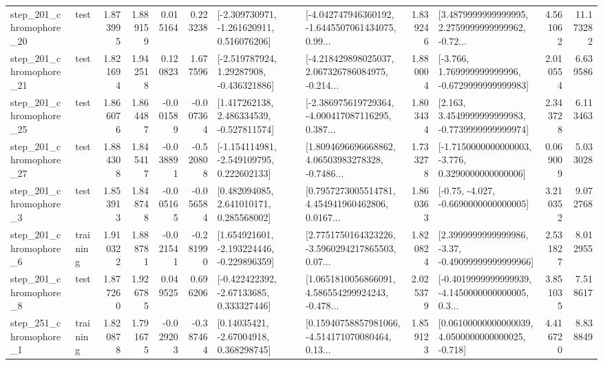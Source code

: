 \begin{tabular}{llrrrrllrlrr}
  step\_201\_chromophore\_20 &      test &      1.873995 &    1.889159 &      0.015164 &  0.223238 &   [-2.309730971, -1.261620911, 0.516076206] &  [-4.042747946360192, -1.6445507061434075, 0.99... &       1.839246 &  [3.4879999999999995, 2.2759999999999962, -0.72... &            4.561062 &         11.173282 \\
  step\_201\_chromophore\_21 &      test &      1.821694 &    1.942518 &      0.120823 &  1.677596 &    [-2.519787924, 1.29287908, -0.436321886] &  [-4.218429898025037, 2.067326786084975, -0.214... &       1.880004 &   [-3.766, 1.769999999999996, -0.6729999999999983] &            2.010554 &          6.639586 \\
  step\_201\_chromophore\_25 &      test &      1.866076 &    1.864487 &     -0.001589 & -0.007364 &    [1.417262138, 2.486334539, -0.527811574] &  [-2.386975619729364, -4.000417087116295, 0.387... &       1.803434 &   [2.163, 3.4549999999999983, -0.7739999999999974] &            2.343728 &          6.113463 \\
  step\_201\_chromophore\_27 &      test &      1.884308 &    1.845417 &     -0.038891 & -0.520808 &   [-1.154114981, -2.549109795, 0.222602133] &  [1.8094696696668862, 4.06503983278328, -0.7486... &       1.733278 &  [-1.7150000000000003, -3.776, 0.3290000000000006] &            0.069009 &          5.033028 \\
   step\_201\_chromophore\_3 &      test &      1.853913 &    1.848748 &     -0.005165 & -0.056584 &     [0.482094085, 2.641010171, 0.285568002] &  [0.7957273005514781, 4.454941960462806, 0.0167... &       1.860363 &               [-0.75, -4.027, -0.6690000000000005] &            3.210352 &          9.072768 \\
   step\_201\_chromophore\_6 &  training &      1.910322 &    1.888781 &     -0.021541 & -0.281990 &   [1.654921601, -2.193224446, -0.229896359] &  [2.7751750164323226, -3.5960294217865503, 0.07... &       1.820824 &  [2.3999999999999986, -3.37, -0.49099999999999966] &            2.531827 &          8.012955 \\
   step\_201\_chromophore\_8 &      test &      1.877260 &    1.926785 &      0.049525 &  0.696206 &    [-0.422422392, -2.67133685, 0.333327446] &  [1.0651810056866091, 4.586554299924243, -0.478... &       2.025379 &  [-0.4019999999999939, -4.1450000000000005, 0.3... &            3.851035 &          7.518617 \\
   step\_251\_chromophore\_1 &  training &      1.820878 &    1.791675 &     -0.029203 & -0.387464 &      [0.14035421, -2.67004918, 0.368298745] &  [0.15940758857981066, -4.514171070080464, 0.13... &       1.859123 &  [0.06100000000000039, 4.0500000000000025, -0.718] &            4.416720 &          8.838849 \\

\end{tabular}
